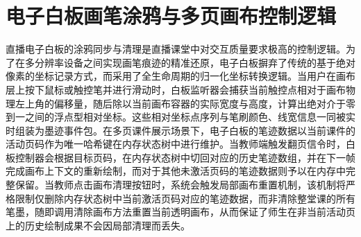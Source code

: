 \section{电子白板画笔涂鸦与多页画布控制逻辑}
直播电子白板的涂鸦同步与清理是直播课堂中对交互质量要求极高的控制逻辑。为了在多分辨率设备之间实现画笔痕迹的精准还原，电子白板摒弃了传统的基于绝对像素的坐标记录方式，而采用了全生命周期的归一化坐标转换逻辑。当用户在画布层上按下鼠标或触控笔并进行滑动时，白板监听器会捕获当前触控点相对于画布物理左上角的偏移量，随后除以当前画布容器的实际宽度与高度，计算出绝对介于零到一之间的浮点型相对坐标。这些相对坐标点序列与笔刷颜色、线宽信息一同被实时组装为墨迹事件包。在多页课件展示场景下，电子白板的笔迹数据以当前课件的活动页码作为唯一哈希键在内存状态树中进行维护。当教师端触发翻页信令时，白板控制器会根据目标页码，在内存状态树中切回对应的历史笔迹数组，并在下一帧完成画布上下文的重新绘制，而对于其他未激活页码的笔迹数据则予以在内存中完整保留。当教师点击画布清理按钮时，系统会触发局部画布重置机制，该机制将严格限制仅删除内存状态树中当前激活页码对应的笔迹数据，而非清除整堂课的所有笔墨，随即调用清除画布方法重置当前透明画布，从而保证了师生在非当前活动页上的历史绘制成果不会因局部清理而丢失。
